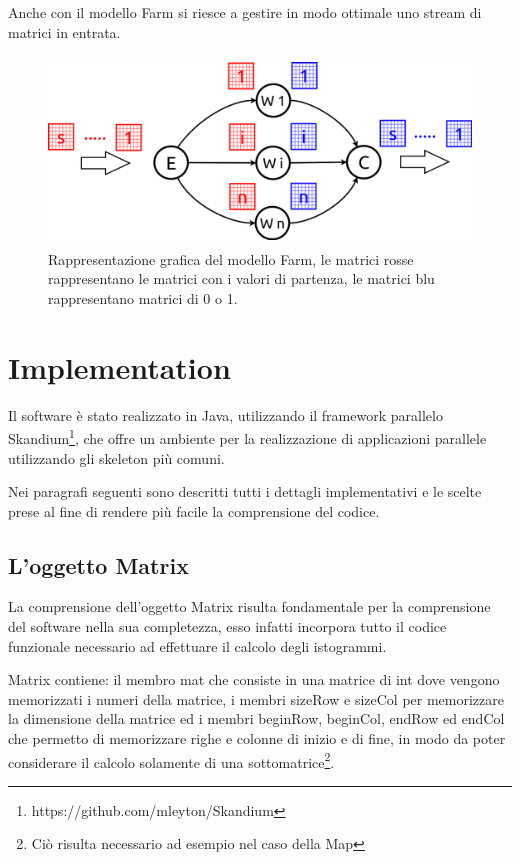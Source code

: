 \documentclass[a4paper,10pt]{article}
\begin{document}
Anche con il modello \textsf{Farm} si riesce a gestire in modo ottimale uno stream di matrici in entrata.

\begin{figure}[ht]
\centering
\includegraphics[height=5cm]{farm.png}
\caption{Rappresentazione grafica del modello \textsf{Farm}, le matrici rosse rappresentano le matrici con i valori di partenza, le matrici blu rappresentano matrici di 0 o 1.}
\label{img:farm}
\end{figure}


\section{Implementation}
\label{sec:implementation}

Il software \`e stato realizzato in Java, utilizzando il framework parallelo Skandium\footnote{https://github.com/mleyton/Skandium}, che offre un ambiente per la realizzazione di applicazioni parallele utilizzando gli skeleton pi\`u comuni.

Nei paragrafi seguenti sono descritti tutti i dettagli implementativi e le scelte prese al fine di rendere pi\`u facile la comprensione del codice.

\subsection{L'oggetto \textsf{Matrix}}

La comprensione dell'oggetto \textsf{Matrix} risulta fondamentale per la comprensione del software nella sua completezza, esso infatti incorpora tutto il codice funzionale necessario ad effettuare il calcolo degli istogrammi.

\textsf{Matrix} contiene: il membro \textsf{mat} che consiste in una matrice di \textsf{int} dove vengono memorizzati i numeri della matrice, i membri \textsf{sizeRow} e \textsf{sizeCol} per memorizzare la dimensione della matrice ed i membri \textsf{beginRow}, \textsf{beginCol}, \textsf{endRow} ed \textsf{endCol} che permetto di memorizzare righe e colonne di inizio e di fine, in modo da poter considerare il calcolo solamente di una sottomatrice\footnote{Ci\`o risulta necessario ad esempio nel caso della \textsf{Map}}.
\end{document}
